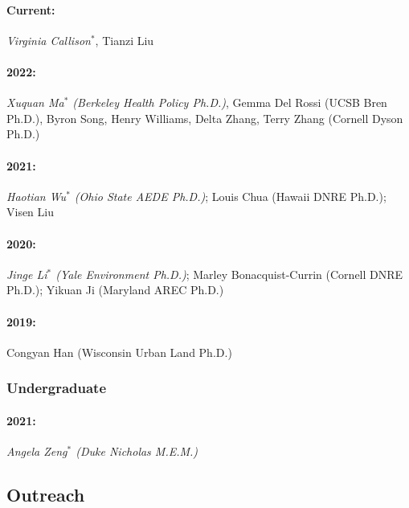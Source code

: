 \documentclass[11pt]{res} %
\begin{document}
\begin{resume}
\paragraph{Current:} \textit{Virginia Callison$^*$}, Tianzi Liu
\vspace{-.4in}
\paragraph{2022:} \textit{Xuquan Ma$^*$ (Berkeley Health Policy Ph.D.)}, Gemma Del Rossi (UCSB Bren Ph.D.), Byron Song, Henry Williams, Delta Zhang, Terry Zhang (Cornell Dyson Ph.D.)
\vspace{-.4in}
\paragraph{2021:} \textit{Haotian Wu$^*$ (Ohio State AEDE Ph.D.)}; Louis Chua (Hawaii DNRE Ph.D.); Visen Liu
\vspace{-.4in}
\paragraph{2020:} \textit{Jinge Li$^*$ (Yale Environment Ph.D.)}; Marley Bonacquist-Currin (Cornell DNRE Ph.D.); Yikuan Ji (Maryland AREC Ph.D.)
\vspace{-.4in}
\paragraph{2019:} Congyan Han (Wisconsin Urban Land Ph.D.)

\vspace{-.2in}

\subsubsection{Undergraduate}\vspace{-.2in}
\paragraph{2021:} \textit{Angela Zeng$^*$  (Duke Nicholas M.E.M.)}

\vspace{-.2in}

\subsection{Outreach}

\vspace{-.2in}


\end{resume}
\end{document}
